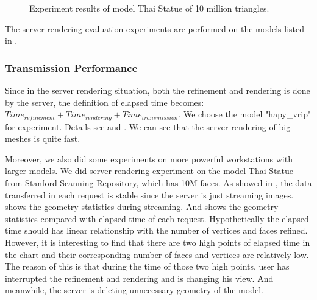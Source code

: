 \begin{figure}
\centering
{}

\label{fig:thai_trans_perf}
\caption{Experiment results of model Thai Statue of 10 million triangles.}
\end{figure}



The server rendering evaluation experiments are performed on the models listed in .

\subsubsection{Transmission Performance}
\label{section:servertransperf}
Since in the server rendering situation, both the refinement and rendering is done by the server, the definition of elapsed time becomes: $Time_{refinement}+Time_{rendering}+Time_{transmission}$. We choose the model "hapy\_vrip" for experiment. Details see  and . We can see that the server rendering of big meshes is quite fast. 

Moreover, we also did some experiments on more powerful workstations with larger models. We did server rendering experiment on the model Thai Statue from Stanford Scanning Repository, which has 10M faces. As showed in , the data transferred in each request is stable since the server is just streaming images.  shows the geometry statistics during streaming. And  shows the geometry statistics compared with elapsed time of each request. Hypothetically the elapsed time should has linear relationship with the number of vertices and faces refined. However, it is interesting to find that there are two high points of elapsed time in the chart and their corresponding number of faces and vertices are relatively low. The reason of this is that during the time of those two high points, user has interrupted the refinement and rendering and is changing his view. And meanwhile, the server is deleting unnecessary geometry of the model. 


